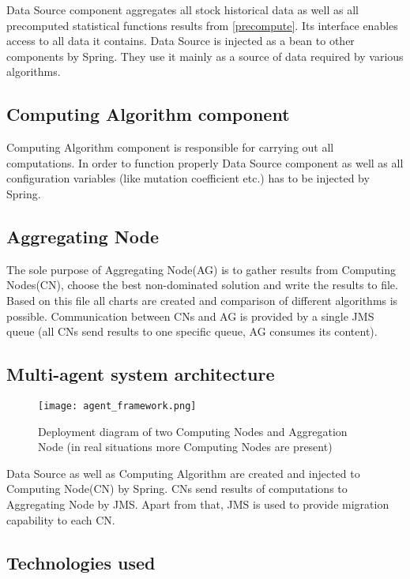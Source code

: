Data Source component aggregates all stock historical data as well as all precomputed statistical functions results from \ref{precompute}.   
Its interface enables access to all data it contains. Data Source is injected as a bean to other components by Spring.
They use it mainly as a source of data required by various algorithms.

\subsection{Computing Algorithm component}

Computing Algorithm component is responsible for carrying out all computations.
In order to function properly Data Source component as well as all configuration variables (like mutation coefficient etc.) has to be injected by Spring.

\subsection{Aggregating Node}

The sole purpose of Aggregating Node(AG) is to gather results from Computing Nodes(CN), choose the best non-dominated solution and write the results to file. 
Based on this file all charts are created and comparison of different algorithms is possible.
Communication between CNs and AG is provided by a single JMS queue (all CNs send results to one specific queue, AG consumes its content).


\subsection{Multi-agent system architecture}
\label{multi-agent}

\begin{figure}[H]
  \begin{center}
    \texttt{[image: agent\_framework.png]}
  \end{center}
  \caption{Deployment diagram of two Computing Nodes and Aggregation Node (in real situations more Computing Nodes are present)}
\end{figure}

Data Source as well as Computing Algorithm are created and injected to Computing Node(CN) by Spring. 
CNs send results of computations to Aggregating Node by JMS. 
Apart from that, JMS is used to provide migration capability to each CN.

\subsection{Technologies used}

